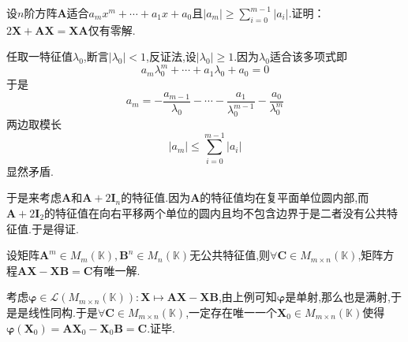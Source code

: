 \begin{brown}
\begin{example}
    设$n$阶方阵$\bm{A}$适合$a_mx^m+
    \cdots+a_1x+a_0
    $且$\displaystyle
    \left|a_m\right|\geqslant
    \sum_{i=0}^{m-1}\left|a_i\right|
    $.证明：$2\bm{X}+\bm{AX}=\bm{XA}$仅有零解.
\end{example}
\begin{Proof}
任取一特征值$\lambda_0$,断言$\left|\lambda_0\right|<1$,反证法,设$\left|\lambda_0\right|\geqslant 1.$因为$\lambda_0$适合该多项式即
\[
a_m\lambda_0^m+\cdots+a_1\lambda_0+a_0=0
\]
于是
\[
a_m=-\frac{a_{m-1}}{\lambda_0}-\cdots-\frac{a_1}{\lambda_0^{m-1}}-\frac{a_0}{\lambda_0^m}
\]
两边取模长\newpage
\[
\left|a_m\right|\leqslant
\sum_{i=0}^{m-1}\left|a_i\right|
\]显然矛盾.

于是来考虑$\bm{A}$和$\bm{A}+2\bm{I}_n$的特征值.因为$\bm{A}$的特征值均在复平面单位圆内部,而$\bm{A}+2\bm{I}_2$的特征值在向右平移两个单位的圆内且均不包含边界于是二者没有公共特征值.于是得证.
\end{Proof}
\end{brown}
\begin{brown}
\begin{example}
    设矩阵$\bm{A}^m\in M_m\left(
        \mathbb{K}
    \right),\bm{B}^n\in M_n\left(\mathbb{K}\right)$无公共特征值,则$\forall \bm{C}\in M_{m\times n}\left(\mathbb{K}\right)$,矩阵方程$\bm{AX}-\bm{XB}=\bm{C}$有唯一解.
\end{example}
\begin{Proof}
考虑$\bm{\varphi}\in \mathcal{L}\left(
    M_{m\times n}\left(\mathbb{K}\right)
\right):\bm{X}\longmapsto
\bm{AX}-\bm{XB}$,由上例可知$\bm{\varphi}$是单射,那么也是满射,于是是线性同构.于是$\forall \bm{C}\in M_{m\times n}\left(\mathbb{K}\right)$,一定存在唯一一个$\bm{X}_0\in M_{m\times n}\left(\mathbb{K}\right)$使得$\bm{\varphi}\left(\bm{X}_0\right)=\bm{AX}_0-\bm{X}_0\bm{B}=\bm{C}.$证毕.
\end{Proof}
\end{brown}
